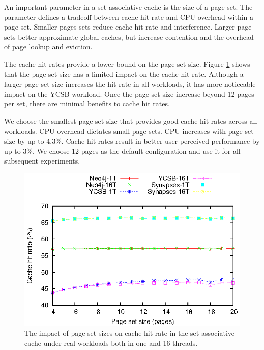 An important parameter in a set-associative cache is the size of a page set.
The parameter defines a tradeoff between cache hit rate and
CPU overhead within a page set.   Smaller pages sets reduce cache hit
rate and interference.  Larger page sets better approximate global caches, but 
increase contention and the overhead of page lookup and eviction.

The cache hit rates provide a lower bound on the page set size.
Figure \ref{hit_ratio} shows that the page set size has a limited impact on
the cache hit rate. 
Although a larger page set size increases the hit rate in all workloads, it
has more noticeable impact on the YCSB workload.  
Once the page set size increase beyond 12 pages per set, there are minimal 
benefits to cache hit rates.

We choose the smallest page set size that provides good cache hit rates 
across all workloads.  CPU overhead dictates small page sets.
CPU increases with page set size by up to 4.3\%.  Cache hit rates
result in better user-perceived performance by up to 3\%.
We choose 12 pages as the default configuration and use it for all subsequent experiments.

\begin{figure}[tb]
\begin{center}
\includegraphics{figs/SAFS/cell-size-hits.eps}
\caption{The impact of page set sizes on cache hit rate in the set-associative cache
under real workloads both in one and 16 threads.}
\label{hit_ratio}
\end{center}
\end{figure}


